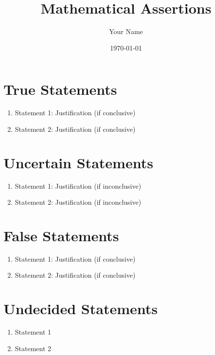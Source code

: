 \documentclass{article}
\begin{document}
\title{Mathematical Assertions}
\author{Your Name}
\date{\today}

\maketitle

\section{True Statements}

\begin{enumerate}
    \item Statement 1: Justification (if conclusive)
    \item Statement 2: Justification (if conclusive)
\end{enumerate}

\section{Uncertain Statements}

\begin{enumerate}
    \item Statement 1: Justification (if inconclusive)
    \item Statement 2: Justification (if inconclusive)
\end{enumerate}

\section{False Statements}

\begin{enumerate}
    \item Statement 1: Justification (if conclusive)
    \item Statement 2: Justification (if conclusive)
\end{enumerate}

\section{Undecided Statements}

\begin{enumerate}
    \item Statement 1
    \item Statement 2
\end{enumerate}
\end{document}
